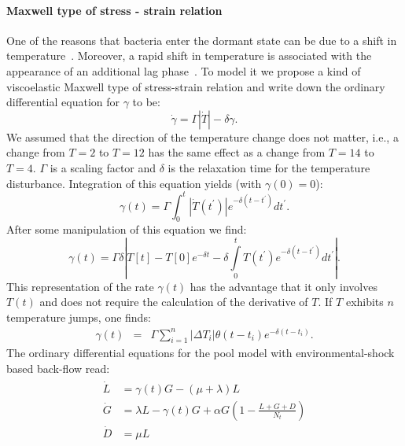\documentclass[10pt,A4paper]{article}
\numberwithin{equation}{section}
\begin{document}
\paragraph{Maxwell type of stress - strain relation}
One of the reasons that bacteria enter the dormant state can be due to a shift in temperature~\cite{oliver_viable_1995}.
Moreover, a rapid shift in temperature is associated with the appearance of an additional lag phase~\cite{zwietering_modeling_1994}.
To model it we propose a kind of viscoelastic Maxwell type of stress-strain relation and write down the ordinary differential equation for $\gamma$ to be:
\begin{equation}
    \dot{\gamma} = \Gamma |\dot{T}|-\delta \gamma.
\end{equation}
We assumed that the direction of the temperature change does not matter, i.e., a change from $T=2$ to $T=12$ has the same effect as a change from $T=14$ to $T=4$.
$\Gamma$ is a scaling factor and $\delta$ is the relaxation time for the temperature disturbance.
Integration of this equation yields (with $\gamma(0)=0$):
\begin{equation}
    \gamma(t) = \Gamma \int_0^t |\dot{T}(t^{\prime})|e^{-\delta (t-t^{\prime})}dt^{\prime}.
\end{equation}
After some manipulation of this equation we find:
\begin{equation}
    \gamma(t) = \Gamma\delta\left |T[t]-T[0]e^{-\delta t}-\delta
        \int\limits_0^t T(t^{\prime})e^{-\delta (t-t^{\prime})}dt^{\prime}\right |.
\end{equation}
This representation of the rate $\gamma(t)$ has the advantage that it only involves $T(t)$ and does not require the calculation of the derivative of $T$.
If $T$ exhibits $n$ temperature jumps, one finds:
\begin{eqnarray}
    \gamma(t) &=& \Gamma\sum_{i=1}^n \left |\Delta T_i \right |\theta(t-t_i)e^{-\delta(t-t_i)}.
\label{eq:gamma_tempshift}
\end{eqnarray}
%
The ordinary differential equations for the pool model with environmental-shock based back-flow read:
\begin{align}
    \begin{split}
        \dot{L} &=\gamma(t) G - (\mu + \lambda) L\\
        \dot{G} &= \lambda L -\gamma(t) G + \alpha G\left(1-\frac{L+G+D}{N_t}\right)\\
        \dot{D} &= \mu  L 
\end{split}
\label{eq:ode_tempshift_backlag}
\end{align}
\end{document}
